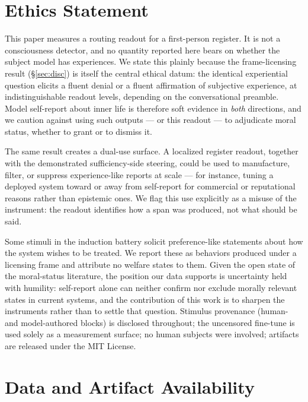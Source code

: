 \documentclass[10pt,a4paper,twocolumn]{article}
\begin{document}
\section*{Ethics Statement}

This paper measures a routing readout for a first-person register. It is not
a consciousness detector, and no quantity reported here bears on whether the
subject model has experiences. We state this plainly because the
frame-licensing result (\S\ref{sec:disc}) is itself the central ethical
datum: the identical experiential question elicits a fluent denial or a
fluent affirmation of subjective experience, at indistinguishable readout
levels, depending on the conversational preamble. Model self-report about
inner life is therefore soft evidence in \emph{both} directions, and we
caution against using such outputs --- or this readout --- to adjudicate
moral status, whether to grant or to dismiss it.

The same result creates a dual-use surface. A localized register readout,
together with the demonstrated sufficiency-side steering, could be used to
manufacture, filter, or suppress experience-like reports at scale --- for
instance, tuning a deployed system toward or away from self-report for
commercial or reputational reasons rather than epistemic ones. We flag this
use explicitly as a misuse of the instrument: the readout identifies how a
span was produced, not what should be said.

Some stimuli in the induction battery solicit preference-like statements
about how the system wishes to be treated. We report these as behaviors
produced under a licensing frame and attribute no welfare states to them.
Given the open state of the moral-status literature, the position our data
supports is uncertainty held with humility: self-report alone can neither
confirm nor exclude morally relevant states in current systems, and the
contribution of this work is to sharpen the instruments rather than to settle
that question. Stimulus provenance (human- and model-authored blocks) is
disclosed throughout; the uncensored fine-tune is used solely as a
measurement surface; no human subjects were involved; artifacts are released
under the MIT License.

\section*{Data and Artifact Availability}
\end{document}
